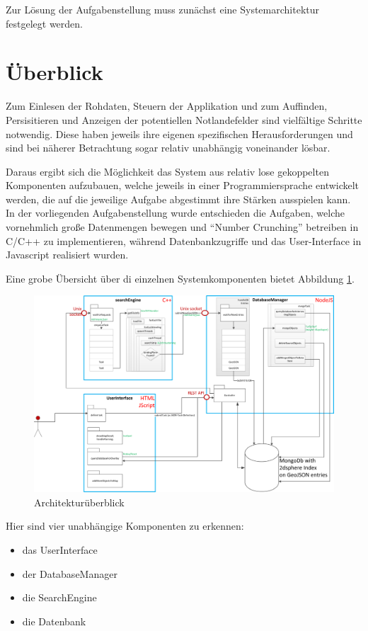 \documentclass[10pt,a4paper]{report}
\begin{document}
Zur Lösung der Aufgabenstellung muss zunächst eine Systemarchitektur festgelegt werden.

\section{Überblick}
Zum Einlesen der Rohdaten, Steuern der Applikation und zum Auffinden, Persisitieren und Anzeigen der potentiellen Notlandefelder sind vielfältige Schritte notwendig. Diese haben jeweils ihre eigenen spezifischen Herausforderungen und sind bei näherer Betrachtung sogar relativ unabhängig voneinander lösbar.

Daraus ergibt sich die Möglichkeit das System aus relativ lose gekoppelten Komponenten aufzubauen, welche jeweils in einer Programmiersprache entwickelt werden, die auf die jeweilige Aufgabe abgestimmt ihre Stärken ausspielen kann. In der vorliegenden Aufgabenstellung wurde entschieden die Aufgaben, welche vornehmlich große Datenmengen bewegen und "`Number Crunching"' betreiben in C/C++ zu implementieren, während Datenbankzugriffe und das User-Interface in Javascript realisiert wurden.

Eine grobe Übersicht über di einzelnen Systemkomponenten bietet Abbildung \ref{architektur}.

\begin{figure}[h]
	\includegraphics[width=\textwidth]{../Architektur/Architektur.png}
	\caption{Architekturüberblick} \label{architektur}
\end{figure}

Hier sind vier unabhängige Komponenten zu erkennen:
\begin{itemize}
	\item das UserInterface
	\item der DatabaseManager
	\item die SearchEngine
	\item die Datenbank
\end{itemize}
\end{document}
